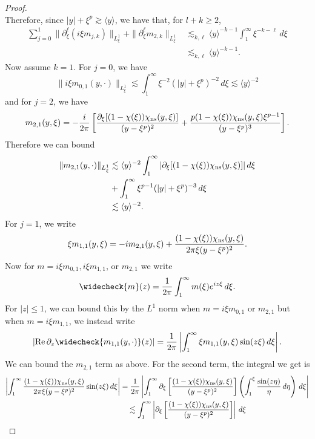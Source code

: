 \documentclass[11pt]{amsart}
\theoremstyle{definition}
\theoremstyle{remark}
\numberwithin{equation}{section}
\newcommand{\ang}[1]{\langle #1 \rangle}
\begin{document}
\begin{proof}
\[    \]
    Therefore, since $|y| + \xi^p \gtrsim \ang{y}$, we have that, for $l+k \geq 2$,
    \[
        \begin{aligned}
        \sum_{j=0}^{1}
        \|\partial_\xi^\ell(i\xi m_{j,k})\|_{L^1_\xi}
        +\|\partial_\xi^\ell m_{2,k}\|_{L^1_\xi}
        &\lesssim_{k,\ell}
        \langle y\rangle^{-k-1}
        \int_1^\infty \xi^{-k-\ell}\,d\xi\\
        &\lesssim_{k,\ell}\langle y\rangle^{-k-1}.
        \end{aligned}
    \]
    Now assume $k = 1$. For $j = 0$, we have 
    \[\|i \xi m_{0,1}(y, \cdot)\|_{L^1_\xi} \lesssim \int_{1}^{\infty}\xi^{-2}(|y| + \xi^p)^{-2} \, d\xi \lesssim \ang{y}^{-2}\]
    and for $j = 2$, we have 
    \[m_{2,1}(y, \xi) = -\frac{i}{2\pi}\left[\frac{\partial_\xi[(1-\chi(\xi))\chi_{\textup{ns}}(y,\xi)]}{(y-\xi^p)^2}+\frac{p(1-\chi(\xi))\chi_{\textup{ns}}(y,\xi)\xi^{p-1}}{(y-\xi^p)^3}\right].\]
    Therefore we can bound 
    \begin{align*}
        \| m_{2,1}(y, \cdot)\|_{L^1_\xi} & \lesssim \ang{y}^{-2}\int_{1}^{\infty}|\partial_\xi[(1-\chi(\xi))\chi_{\textup{ns}}(y,\xi)]| \, d\xi \\
        & + \int_{1}^{\infty}\xi^{p-1}(|y| + \xi^p)^{-3} \, d\xi \\
        & \lesssim \ang{y}^{-2}.
    \end{align*}
    For $j = 1$, we write
    \[\xi m_{1,1}(y,\xi) = -i m_{2,1}(y,\xi)+\frac{(1-\chi(\xi))\chi_{\textup{ns}}(y,\xi)}{2\pi\xi(y-\xi^p)^2}.\]
    Now for $m = i\xi m_{0, 1}, i\xi m_{1,1}$, or $m_{2,1}$ we write
    \[\widecheck{m}(z) = \frac1{2\pi}\int_{1}^{\infty}m(\xi)e^{iz\xi} \, d\xi.\]
    For $|z| \leq 1$, we can bound this by the $L^1$ norm when $m = i\xi m_{0, 1}$ or $m_{2,1}$ but when $m = i\xi m_{1,1}$, we instead write 
    \[\left|\text{Re} \, \partial_z\widecheck{m_{1,1}(y, \cdot)}(z)\right| = \frac1{2\pi}\left|\int_{1}^{\infty} \xi m_{1,1}(y,\xi)\sin(z\xi) \, d\xi\right|.\]
    We can bound the $m_{2,1}$ term as above. For the second term, the integral we get is
    \begin{align*}
        \left|\int_1^\infty\frac{(1-\chi(\xi))\chi_{\textup{ns}}(y,\xi)}{2\pi\xi(y-\xi^p)^2}\sin(z\xi)\,d\xi\right| & =\frac1{2\pi}\left|\int_1^\infty
        \partial_\xi\left[\frac{(1-\chi(\xi))\chi_{\textup{ns}}(y,\xi)}{(y-\xi^p)^2}\right]
        \left(\int_1^\xi\frac{\sin(z\eta)}{\eta}\,d\eta\right)\,d\xi\right|\\
        &\quad\lesssim\int_1^\infty\left|\partial_\xi\left[\frac{(1-\chi(\xi))\chi_{\textup{ns}}(y,\xi)}{(y-\xi^p)^2}\right]\right|\,d\xi\\

\end{align*}
\end{proof}
\end{document}
